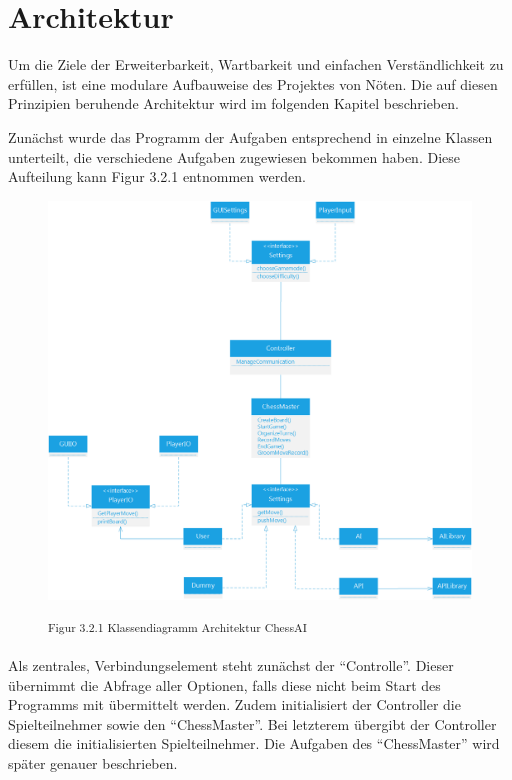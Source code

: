 \section{Architektur}

Um die Ziele der Erweiterbarkeit, Wartbarkeit und einfachen Verständlichkeit zu erfüllen, ist eine modulare Aufbauweise des Projektes von Nöten. Die auf diesen Prinzipien beruhende Architektur wird im folgenden Kapitel beschrieben.

Zunächst wurde das Programm der Aufgaben entsprechend in einzelne Klassen unterteilt, die verschiedene Aufgaben zugewiesen bekommen haben. Diese Aufteilung kann Figur 3.2.1 entnommen werden.

\begin{figure}[h]
\centering
\includegraphics[width=\textwidth*4/5]{images/architecture_class_diagram.png}

\textsuperscript{Figur 3.2.1 Klassendiagramm Architektur ChessAI}
\end{figure}

Als zentrales, Verbindungselement steht zunächst der ``Controlle''. Dieser übernimmt die Abfrage aller Optionen, falls diese nicht beim Start des Programms mit übermittelt werden. Zudem initialisiert der Controller die Spielteilnehmer sowie den ``ChessMaster''. Bei letzterem übergibt der Controller diesem die initialisierten Spielteilnehmer. Die Aufgaben des ``ChessMaster'' wird später genauer beschrieben.

